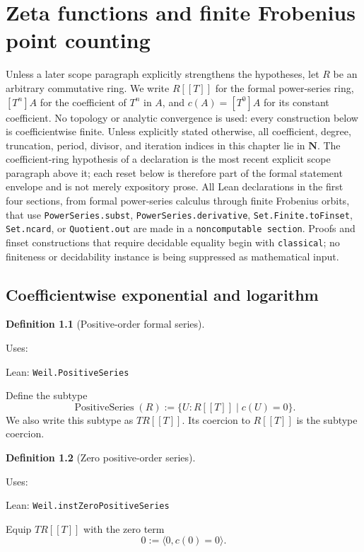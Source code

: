 \documentclass[11pt]{report}
\newcommand{\lean}[1]{%
  \par\smallskip\noindent\textcolor{blue!55!black}{\textsf{Lean:} }%
  \footnotesize\sloppy\nolinkurl{#1}\par}
\newcommand{\uses}[1]{%
  \par\smallskip\noindent\textcolor{purple!60!black}{\textsf{Uses:} }%
  \footnotesize\sloppy\auditdependencylist{#1}\par}
\theoremstyle{definition}
\newtheorem{definition}{Definition}[section]
\theoremstyle{plain}
\theoremstyle{remark}
\begin{document}
\sloppy
\setcounter{chapter}{2}

\chapter{Zeta functions and finite Frobenius point counting}
\label{chap:weil-zeta-point-counting}

Unless a later scope paragraph explicitly strengthens the hypotheses, let $R$
be an arbitrary commutative ring.  We write $R[[T]]$ for the formal
power-series ring, $[T^n]A$ for the coefficient of $T^n$ in $A$, and
$c(A)=[T^0]A$ for its constant coefficient.  No topology or analytic
convergence is used: every construction below is coefficientwise finite.
Unless explicitly stated otherwise, all coefficient, degree, truncation,
period, divisor, and iteration indices in this chapter lie in $\mathbf N$.
The coefficient-ring hypothesis of a declaration is the most recent explicit
scope paragraph above it; each reset below is therefore part of the formal
statement envelope and is not merely expository prose.
All Lean declarations in the first four sections, from formal power-series
calculus through finite Frobenius orbits, that use
\texttt{PowerSeries.subst}, \texttt{PowerSeries.derivative},
\texttt{Set.Finite.toFinset}, \texttt{Set.ncard}, or
\texttt{Quotient.out} are made in a \texttt{noncomputable section}.
Proofs and finset constructions that require decidable equality begin with
\texttt{classical}; no finiteness or decidability instance is being suppressed
as mathematical input.

\section{Coefficientwise exponential and logarithm}
\label{sec:weil-formal-series}

\begin{definition}[Positive-order formal series]
  \label{def:weil-positive-series}
  \uses{}
  \lean{Weil.PositiveSeries}

  Define the subtype
  \[
    \operatorname{PositiveSeries}(R)
      :=\{U:R[[T]]\mid c(U)=0\}.
  \]
  We also write this subtype as $TR[[T]]$.  Its coercion to $R[[T]]$ is
  the subtype coercion.
\end{definition}

\begin{definition}[Zero positive-order series]
  \label{def:weil-positive-series-zero}
  \uses{def:weil-positive-series}
  \lean{Weil.instZeroPositiveSeries}

  Equip $TR[[T]]$ with the zero term
  \[
    0:=\langle 0,c(0)=0\rangle.
  \]
\end{definition}
\end{document}
